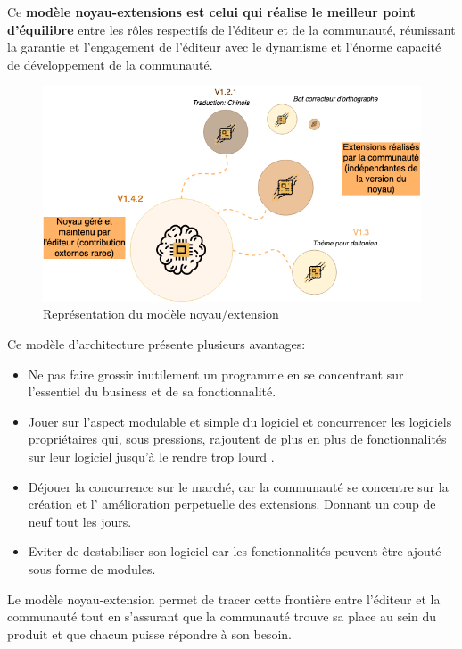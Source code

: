 				Ce \textbf{modèle noyau-extensions est celui qui réalise le meilleur point d'équilibre} entre les rôles respectifs de l'éditeur et de la communauté, réunissant la garantie et l'engagement de l'éditeur avec le dynamisme et l'énorme capacité de développement de la communauté.

				\begin{figure}[!htb]
					\center
					\includegraphics[scale=0.60]{./img/noyauextension_os.png}
					\caption{Représentation du modèle noyau/extension}					
				\end{figure}

				Ce modèle d'architecture présente plusieurs avantages:

				\begin{itemize}[label=\textbullet, font=\LARGE \color{burntorange}]
					\item Ne pas faire grossir inutilement un programme en se concentrant sur l'essentiel du business et de sa fonctionnalité.
					\item Jouer sur l'aspect modulable et simple du logiciel et concurrencer les logiciels propriétaires qui, sous pressions, rajoutent de plus en plus de fonctionnalités sur leur logiciel jusqu'à le rendre trop lourd .
					\item Déjouer la concurrence sur le marché, car la communauté se concentre sur la création et l' amélioration perpetuelle des extensions. Donnant un coup de neuf tout les jours.
					\item Eviter de destabiliser son logiciel car les fonctionnalités peuvent être ajouté sous forme de modules.
				\end{itemize}

				Le modèle noyau-extension permet de tracer cette frontière entre l'éditeur et la communauté tout en s'assurant que la communauté trouve sa place au sein du produit et que chacun puisse répondre à son besoin.

